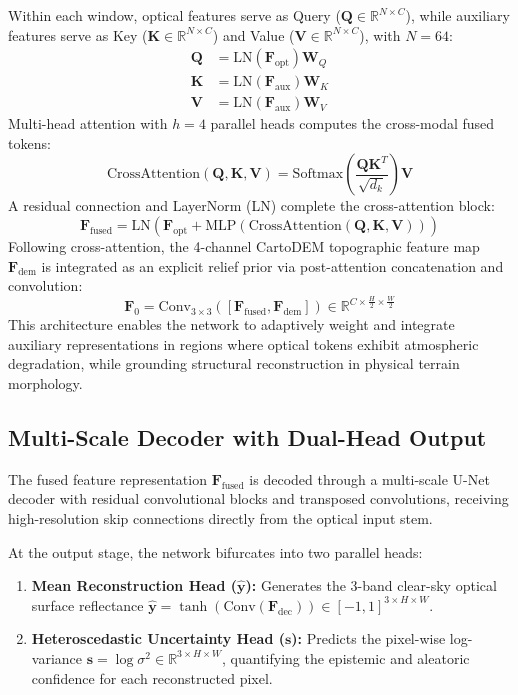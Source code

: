 Within each window, optical features serve as Query ($\mathbf{Q} \in \mathbb{R}^{N \times C}$), while auxiliary features serve as Key ($\mathbf{K} \in \mathbb{R}^{N \times C}$) and Value ($\mathbf{V} \in \mathbb{R}^{N \times C}$), with $N = 64$:
\begin{align}
    \mathbf{Q} &= \text{LN}(\mathbf{F}_{\text{opt}})\mathbf{W}_Q \\
    \mathbf{K} &= \text{LN}(\mathbf{F}_{\text{aux}})\mathbf{W}_K \\
    \mathbf{V} &= \text{LN}(\mathbf{F}_{\text{aux}})\mathbf{W}_V
\end{align}
Multi-head attention with $h = 4$ parallel heads computes the cross-modal fused tokens:
\begin{equation}
    \text{CrossAttention}(\mathbf{Q}, \mathbf{K}, \mathbf{V}) = \text{Softmax}\left(\frac{\mathbf{Q}\mathbf{K}^T}{\sqrt{d_k}}\right)\mathbf{V}
\end{equation}
A residual connection and LayerNorm (LN) complete the cross-attention block:
\begin{equation}
    \mathbf{F}_{\text{fused}} = \text{LN}\left(\mathbf{F}_{\text{opt}} + \text{MLP}(\text{CrossAttention}(\mathbf{Q}, \mathbf{K}, \mathbf{V}))\right)
\end{equation}
Following cross-attention, the 4-channel CartoDEM topographic feature map $\mathbf{F}_{\text{dem}}$ is integrated as an explicit relief prior via post-attention concatenation and convolution:
\begin{equation}
    \mathbf{F}_0 = \text{Conv}_{3\times 3}([\mathbf{F}_{\text{fused}}, \mathbf{F}_{\text{dem}}]) \in \mathbb{R}^{C \times \frac{H}{2} \times \frac{W}{2}}
\end{equation}
This architecture enables the network to adaptively weight and integrate auxiliary representations in regions where optical tokens exhibit atmospheric degradation, while grounding structural reconstruction in physical terrain morphology.

\subsection{Multi-Scale Decoder with Dual-Head Output}
The fused feature representation $\mathbf{F}_{\text{fused}}$ is decoded through a multi-scale U-Net decoder with residual convolutional blocks and transposed convolutions, receiving high-resolution skip connections directly from the optical input stem.

At the output stage, the network bifurcates into two parallel heads:
\begin{enumerate}
    \item \textbf{Mean Reconstruction Head ($\hat{\mathbf{y}}$):} Generates the 3-band clear-sky optical surface reflectance $\hat{\mathbf{y}} = \tanh(\text{Conv}(\mathbf{F}_{\text{dec}})) \in [-1, 1]^{3 \times H \times W}$.
    \item \textbf{Heteroscedastic Uncertainty Head ($\mathbf{s}$):} Predicts the pixel-wise log-variance $\mathbf{s} = \log \sigma^2 \in \mathbb{R}^{3 \times H \times W}$, quantifying the epistemic and aleatoric confidence for each reconstructed pixel.
\end{enumerate}
